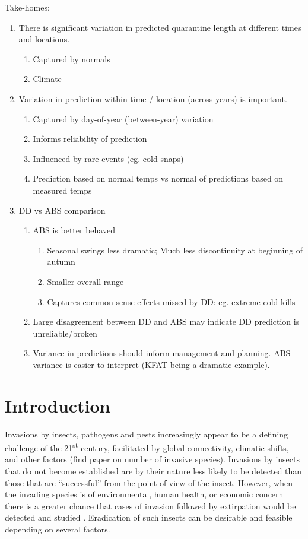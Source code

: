 \documentclass[10pt,a4paper,twocolumn]{article}
\begin{document}
Take-homes:
\begin{enumerate}
\item There is significant variation in predicted quarantine length 
at different times and locations.
  \begin{enumerate}
  \item Captured by normals
  \item Climate
  \end{enumerate}
\item Variation in prediction within time / location (across years) 
is important.
  \begin{enumerate}
  \item Captured by day-of-year (between-year) variation
  \item Informs reliability of prediction
  \item Influenced by rare events (eg. cold snaps)
  \item Prediction based on normal temps vs normal 
  of predictions based on measured temps
  \end{enumerate}
\item DD vs ABS comparison
  \begin{enumerate}
  \item ABS is better behaved
    \begin{enumerate}
    \item Seasonal swings less dramatic; 
    Much less discontinuity at beginning of autumn 
    \item Smaller overall range
    \item Captures common-sense effects missed by DD: 
    eg. extreme cold kills
    \end{enumerate}
  \item Large disagreement between DD and ABS may indicate 
  DD prediction is unreliable/broken
  \item Variance in predictions should inform management and planning.
  ABS variance is easier to interpret (KFAT being a dramatic example).
  \end{enumerate}
\end{enumerate}


\section*{Introduction}

Invasions by insects, pathogens and pests increasingly appear to be a 
defining challenge of the 21\textsuperscript{st} century, facilitated by global connectivity, climatic shifts, and
other factors \cite{simberloff_impacts_2013} (find paper on number of invasive species).
Invasions by insects that do not become established are by their nature less
likely to be detected than those that are ``successful''
from the point of view of the insect.
However, when the invading species is of environmental, human health, or 
economic concern there is a greater chance that cases of invasion followed 
by extirpation would be detected 
and studied \cite{liebhold_population_2008}.
Eradication of such insects can be desirable and 
feasible \cite{myers_eradication_2000} depending on several factors.
\end{document}
